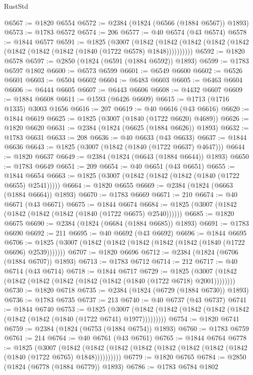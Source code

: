 \begin{lexlean}{RustStd}
\begin{coremodule}
{\begin{coremodule}
{{{{{{{{{{{{{{{{{{{{{{{{{{{{{{{{{{{{{{{{{{{{{{{@6567 := @1820 @6554
@6572 := @2384 (@1824 (@6566 (@1884 @6567)) @1893)
@6573 := @1783 @6572
@6574 := 206
@6577 := @40 @6574 (@43 @6574)
@6578 := @1844 @6577
@6591 := @1825
    (@3007
      (@1842 (@1842 (@1842 (@1842 (@1842 (@1842 (@1842 (@1842 (@1840 (@1722 @6578) @1848))))))))))
@6592 := @1820 @6578
@6597 := @2850 (@1824 (@6591 (@1884 @6592)) @1893)
@6599 := @1783 @6597 @1802
@6600 := @6573 @6599
@6601 := @6549 @6600
@6602 := @6526 @6601
@6603 := @6504 @6602
@6604 := @6483 @6603
@6605 := @6463 @6604
@6606 := @6444 @6605
@6607 := @6443 @6606
@6608 := @4432 @6607
@6609 := @1884 @6608
@6611 := @1593 (@6426 @6609)
@6615 := @1713 (@1716 @1335) @3003 @1656
@6616 := 207
@6619 := @40 @6616 (@43 @6616)
@6620 := @1844 @6619
@6625 := @1825 (@3007 (@1840 (@1722 @6620) @4689))
@6626 := @1820 @6620
@6631 := @2384 (@1824 (@6625 (@1884 @6626)) @1893)
@6632 := @1783 @6631
@6633 := 208
@6636 := @40 @6633 (@43 @6633)
@6637 := @1844 @6636
@6643 := @1825 (@3007 (@1842 (@1840 (@1722 @6637) @4647)))
@6644 := @1820 @6637
@6649 := @2384 (@1824 (@6643 (@1884 @6644)) @1893)
@6650 := @1783 @6649
@6651 := 209
@6654 := @40 @6651 (@43 @6651)
@6655 := @1844 @6654
@6663 := @1825 (@3007 (@1842 (@1842 (@1842 (@1840 (@1722 @6655) @2541)))))
@6664 := @1820 @6655
@6669 := @2384 (@1824 (@6663 (@1884 @6664)) @1893)
@6670 := @1783 @6669
@6671 := 210
@6674 := @40 @6671 (@43 @6671)
@6675 := @1844 @6674
@6684 := @1825 (@3007 (@1842 (@1842 (@1842 (@1842 (@1840 (@1722 @6675) @2540))))))
@6685 := @1820 @6675
@6690 := @2384 (@1824 (@6684 (@1884 @6685)) @1893)
@6691 := @1783 @6690
@6692 := 211
@6695 := @40 @6692 (@43 @6692)
@6696 := @1844 @6695
@6706 := @1825 (@3007 (@1842 (@1842 (@1842 (@1842 (@1842 (@1840 (@1722 @6696) @2539)))))))
@6707 := @1820 @6696
@6712 := @2384 (@1824 (@6706 (@1884 @6707)) @1893)
@6713 := @1783 @6712
@6714 := 212
@6717 := @40 @6714 (@43 @6714)
@6718 := @1844 @6717
@6729 := @1825 (@3007 (@1842 (@1842 (@1842 (@1842 (@1842 (@1842 (@1840 (@1722 @6718) @2001))))))))
@6730 := @1820 @6718
@6735 := @2384 (@1824 (@6729 (@1884 @6730)) @1893)
@6736 := @1783 @6735
@6737 := 213
@6740 := @40 @6737 (@43 @6737)
@6741 := @1844 @6740
@6753 := @1825
    (@3007 (@1842 (@1842 (@1842 (@1842 (@1842 (@1842 (@1842 (@1840 (@1722 @6741) @1977)))))))))
@6754 := @1820 @6741
@6759 := @2384 (@1824 (@6753 (@1884 @6754)) @1893)
@6760 := @1783 @6759
@6761 := 214
@6764 := @40 @6761 (@43 @6761)
@6765 := @1844 @6764
@6778 := @1825
    (@3007
      (@1842 (@1842 (@1842 (@1842 (@1842 (@1842 (@1842 (@1842 (@1840 (@1722 @6765) @1848))))))))))
@6779 := @1820 @6765
@6784 := @2850 (@1824 (@6778 (@1884 @6779)) @1893)
@6786 := @1783 @6784 @1802
}}}}}}}}}}}}}}}}}}}}}}}}}}}}}}}}}}}}}}}}}}}}}}}
\end{coremodule}}
\end{coremodule}
\end{lexlean}
